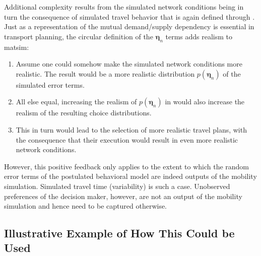 Additional complexity results from the simulated network conditions
being in turn the consequence of simulated travel behavior that is
again defined through . 
Just as a representation
of the mutual demand/supply dependency is essential in transport planning,
the circular definition of the $\boldsymbol{\eta}_n$ terms adds realism to \gls{matsim}:
\begin{enumerate}
\item Assume one could somehow make the simulated network conditions more
realistic. The result would be a more realistic distribution $p(\boldsymbol{\eta}_n)$
of the simulated error terms.
\item All else equal, increasing the realism of $p(\boldsymbol{\eta}_n)$ in 
would also increase the realism of the resulting choice distributions.
\item This in turn would lead to the selection of more realistic travel
plans, with the consequence that their execution would result in even
more realistic network conditions.
\end{enumerate}
However, this positive feedback only applies to the extent to which
the random error terms of the postulated behavioral model are indeed
outputs of the mobility simulation. Simulated travel time (variability)
is such a case. Unobserved preferences of the decision maker, however,
are not an output of the mobility simulation and hence need to be
captured otherwise. 


\subsection{Illustrative Example of How This Could be Used}
%

